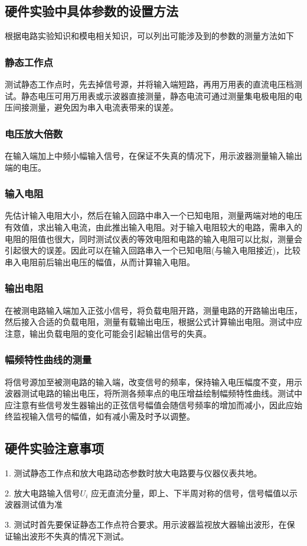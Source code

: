 \documentclass[UTF8,a4paper]{ctexart}
\begin{document}
\subsection{硬件实验中具体参数的设置方法}
根据电路实验知识和模电相关知识，可以列出可能涉及到的参数的测量方法如下
\subsubsection{静态工作点}
测试静态工作点时，先去掉信号源，并将输入端短路，再用万用表的直流电压档测试。静态电压可用万用表或示波器直接测量，静态电流可通过测量集电极电阻的电压间接测量，避免因为串入电流表带来的误差。
\subsubsection{电压放大倍数}
在输入端加上中频小幅输入信号，在保证不失真的情况下，用示波器测量输入输出端的电压。
\subsubsection{输入电阻}
先估计输入电阻大小，然后在输入回路中串入一个已知电阻，测量两端对地的电压有效值，求出输入电流，由此推出输入电阻。对于输入电阻较大的电路，需串入的电阻的阻值也很大，同时测试仪表的等效电阻和电路的输入电阻可以比拟，测量会引起很大的误差。因此可以在输入回路串入一个已知电阻(与输入电阻接近)，比较串入电阻前后输出电压的幅值，从而计算输入电阻。
\subsubsection{输出电阻}
在被测电路输入端加入正弦小信号，将负载电阻开路，测量电路的开路输出电压，然后接入合适的负载电阻，测量有载输出电压，根据公式计算输出电阻。测试中应注意，输出负载电阻的变化可能会引起输出信号的失真。
\subsubsection{幅频特性曲线的测量}
将信号源加至被测电路的输入端，改变信号的频率，保持输入电压幅度不变，用示波器测试电路的输出电压，将所测各频率点的电压增益绘制幅频特性曲线。测试中应注意有些信号发生器输出的正弦信号幅值会随信号频率的增加而减小，因此应始终监视输入信号的幅值，如有减小需及时予以调整。
\subsection{硬件实验注意事项}
1. 测试静态工作点和放大电路动态参数时放大电路要与仪器仪表共地。

2. 放大电路输入信号$U_i$ 应无直流分量，即上、下半周对称的信号，信号幅值以示波器测试值为准

3. 测试时首先要保证静态工作点符合要求。用示波器监视放大器输出波形，在保证输出波形不失真的情况下测试。
\end{document}
